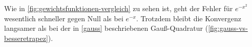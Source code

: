 \documentclass[12pt,a4paper]{scrartcl}
\numberwithin{equation}{section}
\numberwithin{myalgctr}{section}
\numberwithin{mytheoremctr}{section}
\numberwithin{mykorollarctr}{section}
\numberwithin{mylemmactr}{section}
\numberwithin{mybeispielctr}{section}
\begin{document}
	Wie in \cref{fig:gewichtsfunktionen-vergleich} zu sehen ist, geht der Fehler f\"ur $e^{-x^2}$ wesentlich schneller gegen Null als bei $e^{-x}$. Trotzdem bleibt die Konvergenz langsamer als bei der in \cref{gauss} beschriebenen Gau\ss -Quadratur (\cref{fig:gauss-vs-besseretrapez}).


	\newpage
	\printbibliography
	\listoffigures
	\listoftables
	
\end{document}
